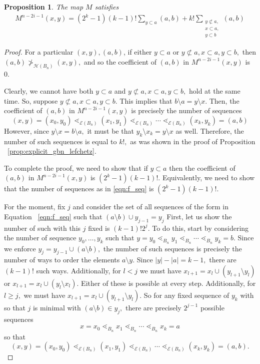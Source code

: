 \documentclass[10 pt]{amsart}
\theoremstyle{plain}
\newtheorem{prop}[thm]{Proposition}
\theoremstyle{definition}
\theoremstyle{remark}
\numberwithin{equation}{section}
\begin{document}
\begin{prop}
The map $M$ satisfies 
\begin{align*}
	M^{n-2i-1}(x, y) = (2^k - 1)(k-1)!\sum_{y \subset a}^{}(a, b) +k! \sum_{\substack{{y \not \subset a,}\\{x\subset a,}\\{y \subset b}}}^{}(a, b)
\end{align*}
\end{prop}
\begin{proof}

For a particular $(x, y),(a , b)$, if either $y \subset a$ or $y \not \subset a, x\subset a, y\subset b,$ then $(a, b) \not >_{ \mathcal H(B_n)} (x, y),$ and so the coefficient of $(a, b)$ in $M^{n-2i-1}(x, y)$ is 0.

Clearly, we cannot have both $y \subset a$ and $y \not \subset a, x\subset a, y\subset b,$ hold at the same time. So, suppose  $y \not \subset a, x\subset a, y\subset b.$ This implies that $b\setminus a = y\setminus x.$ Then, the coefficient of $(a, b)$ in $M^{n-2i-1}(x, y)$ is precisely the number of sequences 
\begin{equation}
\label{eqn:f_seq}
(x, y) = (x_0, y_0) \lessdot_{\mathcal E(B_n)} (x_1, y_1) \lessdot_{\mathcal E(B_n)}  \cdots \lessdot_{\mathcal E(B_n)}  (x_k, y_k) = (a, b)
\end{equation}
 However, since $y \setminus x = b\setminus a,$ it must be that $y_k \setminus x_k = y\setminus x$ as well. Therefore, the number of such sequences is equal to $k!,$ as was shown in the proof of Proposition ~\ref{prop:explicit_gbn_lefchetz}.

To complete the proof, we need to show that if $y \subset a$ then the coefficient of $(a, b)$ in $M^{n-2i-1}(x, y)$ is $(2^k - 1)(k-1)!$. Equivalently, we need to show that the number of sequences as in \eqref{eqn:f_seq}
is $(2^k - 1)(k-1)!.$

For the moment, fix $j$ and consider the set of all sequences of the form in Equation ~\eqref{eqn:f_seq} such that $(a\setminus b) \cup y_{j-1} = y_j$ First, let us show the number of such with this $j$ fixed is $(k-1)!2^j.$ To do this, start by considering the number of sequence $y_0,\ldots, y_k$ such that $y=y_0 \lessdot_{B_n} y_1 \lessdot_{B_n} \cdots \lessdot_{B_n} y_k = b.$ Since we enforce $y_j = y_{j-1} \cup (a \setminus b),$ the number of such sequences is precisely the number of ways to order the elements $a \setminus y.$ Since $|y| - |a| = k-1,$ there are $(k-1)!$ such ways. Additionally, for $l <j$ we must have $x_{l+1} = x_l \cup (y_{l+1} \setminus y_l)$ or $x_{l+1} = x_l \cup (y_l \setminus x_l).$ 
Either of these is possible at every step. Additionally, for $l \geq j,$ we must have $x_{l+1} = x_l \cup (y_{l+1} \setminus y_l).$ So for any fixed sequence of $y_k$ with so that $j$ is minimal with $(a\setminus b) \in y_j,$ 
there are precisely $2^{j-1}$ possible sequences 
$$x=x_0 \lessdot_{B_n} x_1 \lessdot_{B_n} \cdots \lessdot_{B_n} x_k = a$$
so that 
$$(x, y) = (x_0, y_0) \lessdot_{\mathcal E(B_n)} (x_1, y_1) \lessdot_{\mathcal E(B_n)}  \cdots \lessdot_{\mathcal E(B_n)}  (x_k, y_k) = (a, b).$$


\end{proof}
\end{document}
